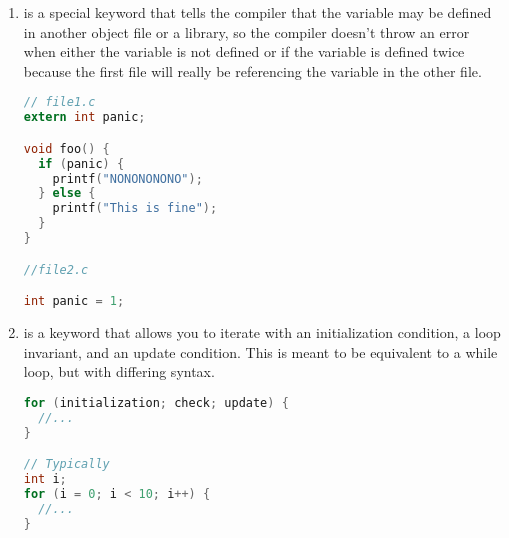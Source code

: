 \begin{enumerate}
	      \begin{lstlisting}[language=C]
enum day{ monday, tuesday, wednesday,
  thursday, friday, saturday, sunday};

void process_day(enum day foo) {
  switch(foo) {
    case monday:
      printf("Go home!\n"); break;
    // ...
  }
}
\end{lstlisting}

	      It is completely possible to assign enum values to either be different or the same.
        It is not advisable to rely on the compiler for consistent numbering, if you do the above. If you are going to use this abstraction, try not to break it.

	      \begin{lstlisting}[language=C]
enum day{
  monday = 0,
  tuesday = 0,
  wednesday = 0,
  thursday = 1,
  friday = 10,
  saturday = 10,
  sunday = 0};

void process_day(enum day foo) {
  switch(foo) {
    case monday:
      printf("Go home!\n"); break;
    // ...
  }
}
\end{lstlisting}

	    \item {} is a special keyword that tells the compiler that the variable may be defined in another object file or a library, so the compiler doesn't throw an error when either the variable is not defined or if the variable is defined twice because the first file will really be referencing the variable in the other file.

	      \begin{lstlisting}[language=C]
// file1.c
extern int panic;

void foo() {
  if (panic) {
    printf("NONONONONO");
  } else {
    printf("This is fine");
  }
}

//file2.c

int panic = 1;
\end{lstlisting}

	    \item {} is a keyword that allows you to iterate with an initialization condition, a loop invariant, and an update condition.
        This is meant to be equivalent to a while loop, but with differing syntax.

	      \begin{lstlisting}[language=C]
for (initialization; check; update) {
  //...
}

// Typically
int i;
for (i = 0; i < 10; i++) {
  //...
}
\end{lstlisting}


\end{enumerate}

